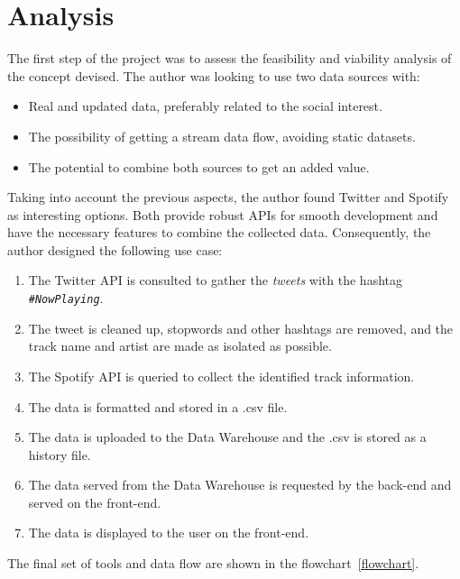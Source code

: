 
\section{Analysis}

\nonzeroparskip The first step of the project was to assess the feasibility and viability analysis of the concept devised. The author was looking to use two data sources with:

\begin{itemize}
	\item Real and updated data, preferably related to the social interest.
	\item The possibility of getting a stream data flow, avoiding static datasets.
	\item The potential to combine both sources to get an added value.
\end{itemize}

\nonzeroparskip Taking into account the previous aspects, the author found Twitter and Spotify as interesting options. Both provide robust APIs for smooth development and have the necessary features to combine the collected data. Consequently, the author designed the following use case:

\begin{enumerate}
	\item The Twitter API is consulted to gather the \textit{tweets} with the hashtag \texttt{\textit{\#NowPlaying}}.
	\item The tweet is cleaned up, stopwords and other hashtags are removed, and the track name and artist are made as isolated as possible.
	\item The Spotify API is queried to collect the identified track information.
	\item The data is formatted and stored in a .csv file.
	\item The data is uploaded to the Data Warehouse and the .csv is stored as a history file.
	\item The data served from the Data Warehouse is requested by the back-end and served on the front-end.
	\item The data is displayed to the user on the front-end.
\end{enumerate}

\nonzeroparskip The final set of tools and data flow are shown in the flowchart~\ref{flowchart}. 

